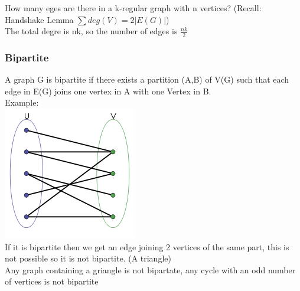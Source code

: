 \documentclass[12pt]{article}
\begin{document}
	How many eges are there in a k-regular graph with n vertices?
	(Recall: Handshake Lemma $\sum deg(V) = 2|E(G)|$)\\
	The total degre is nk, so the number of edges is $\frac{nk}{2}$\\
	
	\subsubsection*{Bipartite}
	A graph G is bipartite if there exists a partition (A,B) of V(G) such that each edge in E(G) joins one vertex in A with one Vertex in B.\\
	
	Example: \\
	\includegraphics[scale=0.5]{bipartite.png}\\
	
	If it is bipartite then we get an edge joining 2 vertices of the same part, this is not possible so it is not bipartite. (A triangle)\\
	
	Any graph containing a griangle is not bipartate, any cycle with an odd number of vertices is not bipartite\\
	
\end{document}
